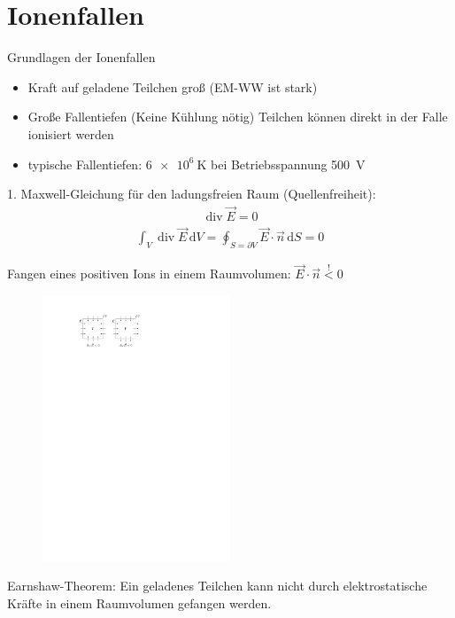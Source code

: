 \documentclass[12pt]{beamer}
\DeclareMathOperator{\divergence}{div}
\begin{document}
\section{Ionenfallen}

\begin{frame}{Grundlagen der Ionenfallen}
	\begin{itemize}
		\item Kraft auf geladene Teilchen groß (EM-WW ist stark)
		\item Große Fallentiefen (Keine Kühlung nötig) Teilchen können direkt in der Falle ionisiert werden
		\item typische Fallentiefen: $\SI{6e6}{\kelvin}$ bei Betriebsspannung \SI{500}{V}
	\end{itemize}
\end{frame}



\begin{frame}
	1. Maxwell-Gleichung für den ladungsfreien Raum (Quellenfreiheit):
	\begin{align}
	\divergence \vec{E} = 0
	\end{align}
	\begin{align}
	\int_{V} \divergence \vec{E} \, \mathrm{d}V = \oint_{S = \partial V} \vec{E} \cdot \vec{n} \, \mathrm{d}S = 0
	\end{align}
	

\end{frame}

\begin{frame}
	Fangen eines positiven Ions in einem Raumvolumen: $\vec{E} \cdot \vec{n} \stackrel{!}{<} 0$
	\begin{figure}
		\centering
		\includegraphics*[width=0.5\textwidth]{./figures/earnshaw.pdf}
	\end{figure}
		\begin{block}{Earnshaw-Theorem:}
			Ein geladenes Teilchen kann nicht durch elektrostatische Kräfte in einem Raumvolumen gefangen werden.
		\end{block}
\end{frame}
\end{document}
